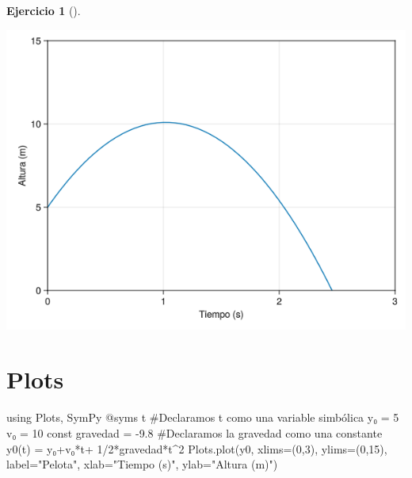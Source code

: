 \documentclass[
  a4paper,
]{scrreport}
\newenvironment{Shaded}{\begin{snugshade}}{\end{snugshade}}
\newcommand{\BuiltInTok}[1]{\textcolor[rgb]{0.00,0.23,0.31}{#1}}
\newcommand{\CommentTok}[1]{\textcolor[rgb]{0.37,0.37,0.37}{#1}}
\newcommand{\FloatTok}[1]{\textcolor[rgb]{0.68,0.00,0.00}{#1}}
\newcommand{\FunctionTok}[1]{\textcolor[rgb]{0.28,0.35,0.67}{#1}}
\newcommand{\ImportTok}[1]{\textcolor[rgb]{0.00,0.46,0.62}{#1}}
\newcommand{\KeywordTok}[1]{\textcolor[rgb]{0.00,0.23,0.31}{#1}}
\newcommand{\NormalTok}[1]{\textcolor[rgb]{0.00,0.23,0.31}{#1}}
\newcommand{\OperatorTok}[1]{\textcolor[rgb]{0.37,0.37,0.37}{#1}}
\newcommand{\PreprocessorTok}[1]{\textcolor[rgb]{0.68,0.00,0.00}{#1}}
\newcommand{\StringTok}[1]{\textcolor[rgb]{0.13,0.47,0.30}{#1}}
\theoremstyle{definition}
\newtheorem{exercise}{Ejercicio}[chapter]
\theoremstyle{remark}
\begin{document}
\begin{exercise}[]
\begin{enumerate}
\begin{tcolorbox}
  \includegraphics{03-funciones-elementales_files/figure-pdf/cell-7-output-1.png}

  \section{Plots}

\begin{Shaded}
\begin{Highlighting}[]
\ImportTok{using} \BuiltInTok{Plots}\NormalTok{, }\BuiltInTok{SymPy}
\PreprocessorTok{@syms}\NormalTok{ t  }\CommentTok{\#Declaramos t como una variable simbólica}
\NormalTok{y₀ }\OperatorTok{=} \FloatTok{5}
\NormalTok{v₀ }\OperatorTok{=} \FloatTok{10}
\KeywordTok{const}\NormalTok{ gravedad }\OperatorTok{=} \OperatorTok{{-}}\FloatTok{9.8}  \CommentTok{\#Declaramos la gravedad como una constante}
\FunctionTok{y0}\NormalTok{(t) }\OperatorTok{=}\NormalTok{ y₀}\OperatorTok{+}\NormalTok{v₀}\OperatorTok{*}\NormalTok{t}\OperatorTok{+} \FloatTok{1}\OperatorTok{/}\FloatTok{2}\OperatorTok{*}\NormalTok{gravedad}\OperatorTok{*}\NormalTok{t}\OperatorTok{\^{}}\FloatTok{2}
\NormalTok{Plots.}\FunctionTok{plot}\NormalTok{(y0, xlims}\OperatorTok{=}\NormalTok{(}\FloatTok{0}\NormalTok{,}\FloatTok{3}\NormalTok{), ylims}\OperatorTok{=}\NormalTok{(}\FloatTok{0}\NormalTok{,}\FloatTok{15}\NormalTok{), label}\OperatorTok{=}\StringTok{"Pelota"}\NormalTok{, xlab}\OperatorTok{=}\StringTok{"Tiempo (s)"}\NormalTok{, ylab}\OperatorTok{=}\StringTok{"Altura (m)"}\NormalTok{)}
\end{Highlighting}
\end{Shaded}


\end{tcolorbox}
\end{enumerate}
\end{exercise}
\end{document}
